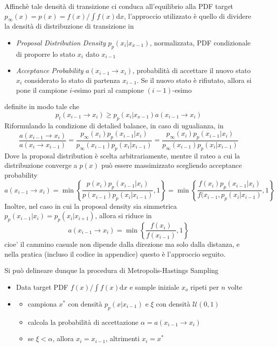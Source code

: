 Affinch\`e tale densit\`a di transizione ci conduca all'equilibrio alla PDF target \mbox{$p_\infty(x)=p(x)=f(x)/\int f(x)\mathrm{d}x$},
l'approccio utilizzato \`e quello di dividere la densit\`a di distribuzione di transizione in 
\begin{itemize}[noitemsep,topsep=0pt]
	\item \textit{Proposal Distribution Density} $p_p(x_i|x_{x-1})$, normalizzata, PDF condizionale di proporre lo stato $x_i$ dato $x_{i-1}$
	\item \textit{Acceptance Probability} $a(x_{i-1}\to x_i)$, probabilit\`a di accettare il nuovo stato $x_i$ considerato lo stato di partenza 
		$x_{i-1}$. Se il nuovo stato \`e rifiutato, allora si pone il campione $i$-esimo pari al campione $(i-1)$-esimo
\end{itemize}
definite in modo tale che
\begin{equation}
	p_t(x_{i-1}\to x_i)\geq p_p(x_i|x_{x-1})a(x_{i-1}\to x_i)
\end{equation}
Riformulando la condizione di detalied balance, in caso di ugualianza, in
\begin{equation}
	\frac{a(x_{i-1}\to x_i)}{a(x_i\to x_{i-1})}=\frac{p_\infty(x_i)p_p(x_{i-1}|x_i)}{p_\infty(x_{i-1})p_p(x_i|x_{i-1})}%
		=\frac{p_\infty(x_i)p_p(x_{i-1}|x_i)}{p_\infty(x_{i-1})p_p(x_i|x_{i-1})}
\end{equation}
Dove la proposal distribution \`e scelta arbitrariamente, mentre il rateo a cui la distribuzione converge a $p(x)$ pu\`o essere massimizzato scegliendo
acceptance probability \cite{pegoraro}
\begin{equation}\label{chapter6:metropolis:acceptance}
	a(x_{i-1}\to x_i)=\min\left\{\frac{p(x_i)p_p(x_{i-1}|x_i)}{p(x_{i-1})p_p(x_i|x_{i-1})}, 1\right\}=
		\min\left\{\frac{f(x_i)p_p(x_{i-1}|x_i)}{f(x_{i-1},p_p(x_i|x_{i-1})}, 1\right\}
\end{equation}
Inoltre, nel caso in cui la proposal density sia simmetrica \mbox{$p_p(x_{i-1}|x_i)=p_p(x_i|x_{i+1})$}, allora si riduce in 
\begin{equation}
	a(x_{i-1}\to x_i)=\min\left\{\frac{f(x_i)}{f(x_{i-1})}, 1\right\}
\end{equation}
cioe' il cammino casuale non dipende dalla direzione ma solo dalla distanza, e nella pratica (incluso il codice in appendice) questo \`e l'approccio 
seguito.\par
Si pu\`o delineare dunque la procedura di Metropolis-Hastings Sampling
\begin{itemize}[noitemsep,topsep=0pt]
	\item Data target PDF $f(x)/\int f(x)\mathrm{d}x$ e sample iniziale $x_o$ ripeti per $n$ volte
	\item[]\begin{itemize}[noitemsep,topsep=0pt]
		\item campiona $x^*$ con densit\`a $p_p(x|x_{i-1})$ e $\xi$ con densit\`a $\mathcal{U}(0,1)$
		\item calcola la probabilit\`a di accettazione $\alpha = a(x_{i-1}\to x_i)$
		\item se $\xi < \alpha$, allora $x_i = x_{i-1}$, altrimenti $x_i = x^*$
	\end{itemize}
\end{itemize}
